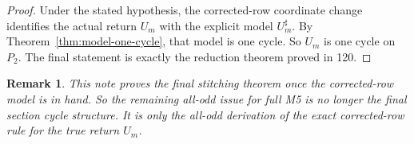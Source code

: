 \documentclass[11pt]{article}
\newtheorem{remark}[theorem]{Remark}
\newcommand{\Um}{U_m^{\sharp}}
\begin{document}
\begin{proof}
Under the stated hypothesis, the corrected-row coordinate change identifies the
actual return $U_m$ with the explicit model $\Um$. By
Theorem~\ref{thm:model-one-cycle}, that model is one cycle. So $U_m$ is one
cycle on $P_2$. The final statement is exactly the reduction theorem proved in
120.
\end{proof}

\begin{remark}
This note proves the final stitching theorem once the corrected-row model is in
hand. So the remaining all-odd issue for full M5 is no longer the final section
cycle structure. It is only the all-odd derivation of the exact corrected-row
rule for the true return $U_m$.
\end{remark}
\end{document}
